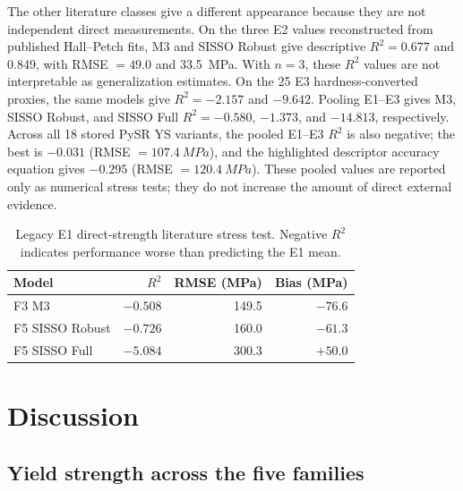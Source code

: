 \documentclass[5p,times,twocolumn]{elsarticle}
\begin{document}
The other literature classes give a different appearance because they are not independent direct measurements. On the three E2 values reconstructed from published Hall--Petch fits, M3 and SISSO Robust give descriptive $R^2=0.677$ and 0.849, with RMSE $=49.0$ and \SI{33.5}{MPa}. With $n=3$, these $R^2$ values are not interpretable as generalization estimates. On the 25 E3 hardness-converted proxies, the same models give $R^2=-2.157$ and $-9.642$. Pooling E1--E3 gives M3, SISSO Robust, and SISSO Full $R^2=-0.580$, $-1.373$, and $-14.813$, respectively. Across all 18 stored PySR YS variants, the pooled E1--E3 $R^2$ is also negative; the best is $-0.031$ (RMSE $=\SI{107.4}{MPa}$), and the highlighted descriptor accuracy equation gives $-0.295$ (RMSE $=\SI{120.4}{MPa}$). These pooled values are reported only as numerical stress tests; they do not increase the amount of direct external evidence.

\begin{table}[t]
\centering
\caption{Legacy E1 direct-strength literature stress test. Negative $R^2$ indicates performance worse than predicting the E1 mean.}
\label{tab:external}
\small
\begin{tabular}{lrrr}
\toprule
Model & $R^2$ & RMSE (MPa) & Bias (MPa) \\
\midrule
F3 M3 & $-0.508$ & 149.5 & $-76.6$ \\
F5 SISSO Robust & $-0.726$ & 160.0 & $-61.3$ \\
F5 SISSO Full & $-5.084$ & 300.3 & $+50.0$ \\
\bottomrule
\end{tabular}
\end{table}

\section{Discussion}
\label{sec:discussion}

\subsection{Yield strength across the five families}
\end{document}
